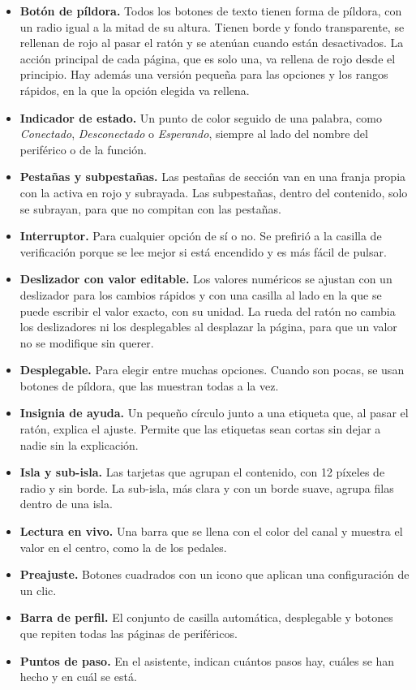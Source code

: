 \begin{itemize}
	\item \textbf{Botón de píldora.} Todos los botones de texto tienen forma de píldora, con un radio igual a la mitad de su altura. Tienen borde y fondo transparente, se rellenan de rojo al pasar el ratón y se atenúan cuando están desactivados. La acción principal de cada página, que es solo una, va rellena de rojo desde el principio. Hay además una versión pequeña para las opciones y los rangos rápidos, en la que la opción elegida va rellena.
	\item \textbf{Indicador de estado.} Un punto de color seguido de una palabra, como \textit{Conectado}, \textit{Desconectado} o \textit{Esperando}, siempre al lado del nombre del periférico o de la función.
	\item \textbf{Pestañas y subpestañas.} Las pestañas de sección van en una franja propia con la activa en rojo y subrayada. Las subpestañas, dentro del contenido, solo se subrayan, para que no compitan con las pestañas.
	\item \textbf{Interruptor.} Para cualquier opción de sí o no. Se prefirió a la casilla de verificación porque se lee mejor si está encendido y es más fácil de pulsar.
	\item \textbf{Deslizador con valor editable.} Los valores numéricos se ajustan con un deslizador para los cambios rápidos y con una casilla al lado en la que se puede escribir el valor exacto, con su unidad. La rueda del ratón no cambia los deslizadores ni los desplegables al desplazar la página, para que un valor no se modifique sin querer.
	\item \textbf{Desplegable.} Para elegir entre muchas opciones. Cuando son pocas, se usan botones de píldora, que las muestran todas a la vez.
	\item \textbf{Insignia de ayuda.} Un pequeño círculo junto a una etiqueta que, al pasar el ratón, explica el ajuste. Permite que las etiquetas sean cortas sin dejar a nadie sin la explicación.
	\item \textbf{Isla y sub-isla.} Las tarjetas que agrupan el contenido, con 12 píxeles de radio y sin borde. La sub-isla, más clara y con un borde suave, agrupa filas dentro de una isla.
	\item \textbf{Lectura en vivo.} Una barra que se llena con el color del canal y muestra el valor en el centro, como la de los pedales.
	\item \textbf{Preajuste.} Botones cuadrados con un icono que aplican una configuración de un clic.
	\item \textbf{Barra de perfil.} El conjunto de casilla automática, desplegable y botones que repiten todas las páginas de periféricos.
	\item \textbf{Puntos de paso.} En el asistente, indican cuántos pasos hay, cuáles se han hecho y en cuál se está.
\end{itemize}


